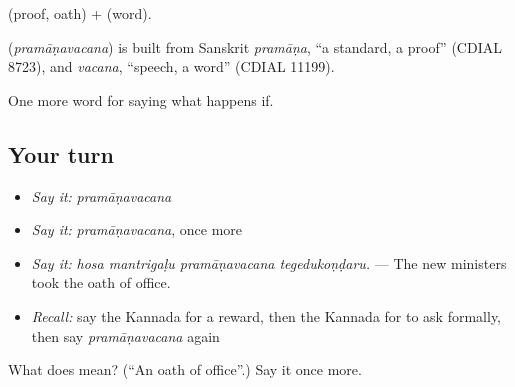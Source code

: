  (proof, oath) +  (word).

\begin{cousinweb}
\textbf{} (\emph{pramāṇavacana}) is built from Sanskrit \emph{pramāṇa}, \textquotedblleft{}a standard, a proof\textquotedblright{} (CDIAL 8723), and \emph{vacana}, \textquotedblleft{}speech, a word\textquotedblright{} (CDIAL 11199).
\end{cousinweb}

\begin{grammarlens}[title={What you've built}]
One more word for saying what happens if.
\end{grammarlens}

\subsection*{Your turn}
\begin{itemize}
\raggedright
  \item \emph{Say it:} \emph{pramāṇavacana}
  \item \emph{Say it:} \emph{pramāṇavacana}, once more
  \item \emph{Say it:} \emph{hosa mantrigaḷu pramāṇavacana tegedukoṇḍaru.} — The new ministers took the oath of office.
  \item \emph{Recall:} say the Kannada for a reward, then the Kannada for to ask formally, then say \emph{pramāṇavacana} again
\end{itemize}

\begin{tcolorbox}[breakable,colback=teal!4,colframe=teal!35!black,title={Before you move on}]
What does  mean? (\textquotedblleft{}An oath of office\textquotedblright{}.) Say it once more.
\end{tcolorbox}
